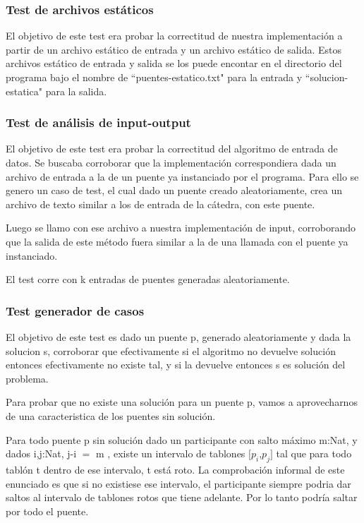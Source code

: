 \subsubsection{Test de archivos est\'aticos}

El objetivo de este test era probar la correctitud de nuestra implementaci\'on a partir de un archivo est\'atico de entrada y un archivo est\'atico de salida.
Estos archivos est\'atico de entrada y salida se los puede encontar en el directorio del programa bajo el nombre de ``puentes-estatico.txt" para la entrada y ``solucion-estatica" para la salida.


\subsubsection{Test de an\'alisis de input-output}

El objetivo de este test era probar la correctitud del algoritmo de entrada de datos.
Se buscaba corroborar que la implementaci\'on correspondiera dada un archivo de entrada a la de un puente ya instanciado por el programa.
Para ello se genero un caso de test, el cual dado un puente creado aleatoriamente, crea un archivo de texto similar a los de entrada de la c\'atedra, con este puente. 

Luego se llamo con ese archivo a nuestra implementaci\'on de input, corroborando que la salida de este m\'etodo fuera similar a la de una llamada con el puente ya instanciado.

El test corre con k entradas de puentes generadas aleatoriamente.

\subsubsection{Test generador de casos}

El objetivo de este test es dado un puente p, generado aleatoriamente y dada la solucion s, corroborar que efectivamente si el algoritmo no devuelve soluci\'on entonces efectivamente no existe tal, y si la devuelve entonces s es soluci\'on del problema.

Para probar que no existe una soluci\'on para un puente p, vamos a aprovecharnos de una caracteristica de los puentes sin soluci\'on.

Para todo puente p sin soluci\'on dado un participante con salto m\'aximo m:Nat, y dados i,j:Nat, j-i $=$ m , existe un intervalo de tablones $[p_{i}$,$p_{j}]$ tal que para todo tabl\'on t dentro de ese intervalo, t est\'a roto.
La comprobaci\'on informal de este enunciado es que si no existiese ese intervalo, el participante siempre podria dar saltos al intervalo de tablones rotos que tiene adelante. Por lo tanto podr\'ia saltar por todo el puente.

